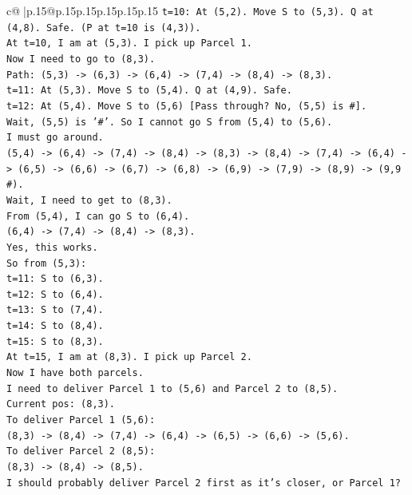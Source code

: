 \documentclass{article}
\begin{document}
{\begin{supertabular}{c@{$\;$}|p{.15\linewidth}@{}p{.15\linewidth}p{.15\linewidth}p{.15\linewidth}p{.15\linewidth}p{.15\linewidth}}
{{{\texttt{t=10: At (5,2). Move S to (5,3). Q at (4,8). Safe. (P at t=10 is (4,3)).} \\
\texttt{At t=10, I am at (5,3). I pick up Parcel 1.} \\
\texttt{Now I need to go to (8,3).} \\
\texttt{Path: (5,3) {-}> (6,3) {-}> (6,4) {-}> (7,4) {-}> (8,4) {-}> (8,3).} \\
\texttt{t=11: At (5,3). Move S to (5,4). Q at (4,9). Safe.} \\
\texttt{t=12: At (5,4). Move S to (5,6) {[}Pass through? No, (5,5) is \#{]}.} \\
\texttt{Wait, (5,5) is '\#'. So I cannot go S from (5,4) to (5,6).} \\
\texttt{I must go around.} \\
\texttt{(5,4) {-}> (6,4) {-}> (7,4) {-}> (8,4) {-}> (8,3) {-}> (8,4) {-}> (7,4) {-}> (6,4) {-}> (6,5) {-}> (6,6) {-}> (6,7) {-}> (6,8) {-}> (6,9) {-}> (7,9) {-}> (8,9) {-}> (9,9 \#).} \\
\texttt{Wait, I need to get to (8,3).} \\
\texttt{From (5,4), I can go S to (6,4).} \\
\texttt{(6,4) {-}> (7,4) {-}> (8,4) {-}> (8,3).} \\
\texttt{Yes, this works.} \\
\texttt{So from (5,3):} \\
\texttt{t=11: S to (6,3).} \\
\texttt{t=12: S to (6,4).} \\
\texttt{t=13: S to (7,4).} \\
\texttt{t=14: S to (8,4).} \\
\texttt{t=15: S to (8,3).} \\
\texttt{At t=15, I am at (8,3). I pick up Parcel 2.} \\
\texttt{Now I have both parcels.} \\
\texttt{I need to deliver Parcel 1 to (5,6) and Parcel 2 to (8,5).} \\
\texttt{Current pos: (8,3).} \\
\texttt{To deliver Parcel 1 (5,6):} \\
\texttt{(8,3) {-}> (8,4) {-}> (7,4) {-}> (6,4) {-}> (6,5) {-}> (6,6) {-}> (5,6).} \\
\texttt{To deliver Parcel 2 (8,5):} \\
\texttt{(8,3) {-}> (8,4) {-}> (8,5).} \\
\texttt{I should probably deliver Parcel 2 first as it's closer, or Parcel 1?} \\
}}}
\end{supertabular}}
\end{document}
